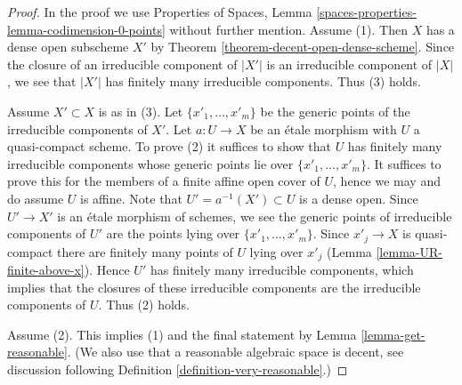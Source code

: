 \documentclass{stacks-project}
\theoremstyle{plain}
\theoremstyle{definition}
\theoremstyle{remark}
\numberwithin{equation}{subsection}
\begin{document}
\begin{proof}
In the proof we use Properties of Spaces, Lemma
\ref{spaces-properties-lemma-codimension-0-points}
without further mention.
Assume (1). Then $X$ has a dense open subscheme $X'$ by
Theorem \ref{theorem-decent-open-dense-scheme}.
Since the closure of an irreducible component of $|X'|$
is an irreducible component of $|X|$, we see that $|X'|$
has finitely many irreducible components. Thus (3) holds.

\medskip\noindent
Assume $X' \subset X$ is as in (3). Let $\{x'_1, \ldots, x'_m\}$
be the generic points of the irreducible components of $X'$.
Let $a : U \to X$ be an \'etale morphism with $U$ a quasi-compact scheme.
To prove (2) it suffices to show that $U$ has
finitely many irreducible components
whose generic points lie over $\{x'_1, \ldots, x'_m\}$. It suffices
to prove this for the members of a finite affine open cover of $U$,
hence we may and do assume $U$ is affine.
Note that $U' = a^{-1}(X') \subset U$ is a dense open.
Since $U' \to X'$ is an \'etale morphism of schemes, we see
the generic points of irreducible components of $U'$ are the points
lying over $\{x'_1, \ldots, x'_m\}$. Since $x'_j \to X$ is
quasi-compact there are finitely many points of $U$ lying over $x'_j$
(Lemma \ref{lemma-UR-finite-above-x}). Hence $U'$ has finitely
many irreducible components, which implies that the closures
of these irreducible components are the irreducible components of
$U$. Thus (2) holds.

\medskip\noindent
Assume (2). This implies (1) and the final
statement by Lemma \ref{lemma-get-reasonable}.
(We also use that a reasonable algebraic space is decent, see
discussion following Definition \ref{definition-very-reasonable}.)
\end{proof}
\end{document}
